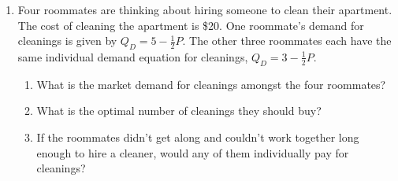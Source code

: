 \documentclass{article}
\begin{document}
\begin{enumerate}
\begin{enumerate}
	\end{enumerate}

\item Four roommates are thinking about hiring someone to clean their apartment. The cost of cleaning the apartment is \$20. One roommate's demand for cleanings is given by $Q_D = 5 - \frac{1}{2}P$. The other three roommates each have the same individual demand equation for cleanings, $Q_D = 3 - \frac{1}{2}P$.

	\begin{enumerate}
	
	\item What is the market demand for cleanings amongst the four roommates? 
	
	\item What is the optimal number of cleanings they should buy?
	
	\item If the roommates didn't get along and couldn't work together long enough to hire a cleaner, would any of them individually pay for cleanings?  
		
	\end{enumerate} 
	
\end{enumerate}
\end{document}
